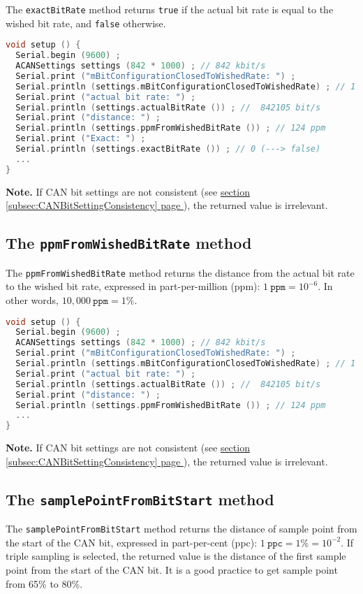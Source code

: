 \documentclass[9pt, a4paper, obeyspaces, openany]{extarticle}
\newcommand \subsectionLabel[2]{\subsection{#1}\label{subsec:#2}}
\newcommand\refSubsectionPage[1]{\hyperref[subsec:#1]{section \ref*{subsec:#1} page \pageref{subsec:#1}}}
\begin{document}
The \texttt{exactBitRate} method returns \texttt{true} if the actual bit rate is equal to the wished bit rate, and \texttt{false} otherwise.

{ \small\begin{lstlisting}[language=c++]
void setup () {
  Serial.begin (9600) ;
  ACANSettings settings (842 * 1000) ; // 842 kbit/s
  Serial.print ("mBitConfigurationClosedToWishedRate: ") ;
  Serial.println (settings.mBitConfigurationClosedToWishedRate) ; // 1 (--> is true)
  Serial.print ("actual bit rate: ") ;
  Serial.println (settings.actualBitRate ()) ; //  842105 bit/s
  Serial.print ("distance: ") ;
  Serial.println (settings.ppmFromWishedBitRate ()) ; // 124 ppm
  Serial.print ("Exact: ") ;
  Serial.println (settings.exactBitRate ()) ; // 0 (---> false)
  ...
}
\end{lstlisting}}

{\bf Note. } If CAN bit settings are not consistent (see \refSubsectionPage{CANBitSettingConsistency}), the returned value is irrelevant.






\subsectionLabel{The \texttt{ppmFromWishedBitRate} method}{ppmFromWishedBitRate}


The \texttt{ppmFromWishedBitRate} method returns the distance from the actual bit rate to the wished bit rate, expressed in part-per-million (ppm): $1~\texttt{ppm} = 10^{-6}$. In other words, $10,000~\texttt{ppm}=1\%$.

{ \small\begin{lstlisting}[language=c++]
void setup () {
  Serial.begin (9600) ;
  ACANSettings settings (842 * 1000) ; // 842 kbit/s
  Serial.print ("mBitConfigurationClosedToWishedRate: ") ;
  Serial.println (settings.mBitConfigurationClosedToWishedRate) ; // 1 (--> is true)
  Serial.print ("actual bit rate: ") ;
  Serial.println (settings.actualBitRate ()) ; //  842105 bit/s
  Serial.print ("distance: ") ;
  Serial.println (settings.ppmFromWishedBitRate ()) ; // 124 ppm
  ...
}
\end{lstlisting}}

{\bf Note. } If CAN bit settings are not consistent (see \refSubsectionPage{CANBitSettingConsistency}), the returned value is irrelevant.






\subsectionLabel{The \texttt{samplePointFromBitStart} method}{samplePointFromBitStart}


The \texttt{samplePointFromBitStart} method returns the distance of sample point from the start of the CAN bit, expressed in part-per-cent (ppc): $1~\texttt{ppc} = 1\% = 10^{-2}$. If triple sampling is selected, the returned value is the distance of the first sample point from the start of the CAN bit. It is a good practice to get sample point from 65\% to 80\%.
\end{document}
